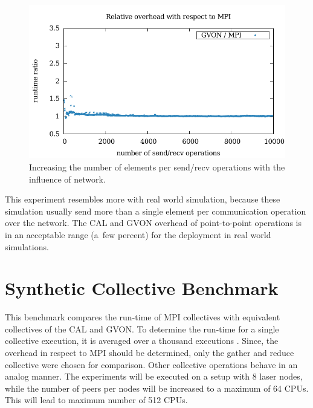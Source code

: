 \begin{figure}[H]
\begin{minipage}[t]{0.5\textwidth}
    \includegraphics[width=\textwidth]{plots/50_nsize_network_overhead_gvon_laser}
  \end{minipage}%
  \caption{Increasing the number of elements per send/recv operations with the influence of network.}
  \label{fig:nsend_network}
\end{figure}

\noindent This experiment resembles more with real world simulation,
because these simulation usually send more than a single element per
communication operation over the network.  The CAL and GVON overhead
of point-to-point operations is in an acceptable range (a~few percent)
for the deployment in real world simulations.


\section{Synthetic Collective Benchmark}
This benchmark compares the run-time of MPI collectives with
equivalent collectives of the CAL and GVON.  To determine the run-time
for a single collective execution, it is averaged over a thousand
executions .  Since, the overhead in respect to MPI should be
determined, only the gather and reduce collective were chosen for
comparison. Other collective operations behave in an analog
manner. The experiments will be executed on a setup with 8 laser
nodes, while the number of peers per nodes will be increased to a
maximum of 64 CPUs.  This will lead to maximum number of 512 CPUs.

